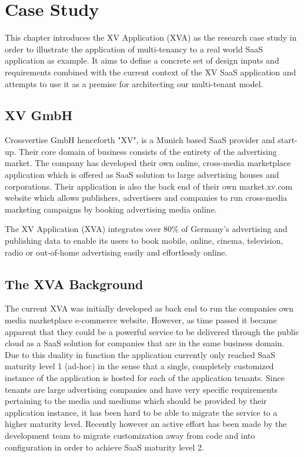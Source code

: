 \chapter{Case Study}

This chapter introduces the XV Application (XVA) as the research case study in order to illustrate the application of multi-tenancy  to a real world SaaS  application as example. It aims to define a concrete set of design inputs and requirements combined with the current context of the XV SaaS application and attempts to use it as a premise for architecting our multi-tenant model. 


\section{XV GmbH}

Crossvertise GmbH henceforth "XV", is a Munich based SaaS provider and start-up. Their core domain of business consists of the entirety of the advertising market. The company has developed their own online, cross-media marketplace application which is offered as SaaS solution to large advertising houses and corporations. Their application is also the back end of their own market.xv.com website which allows publishers, advertisers and companies to run cross-media marketing campaigns by booking advertising media online.
 
The XV Application (XVA) integrates over 80\% of Germany's advertising and publishing data to enable its users to book mobile, online, cinema, television, radio or out-of-home advertising easily and effortlessly online.



\section{The XVA Background}

The current XVA was initially developed as back end to run the companies own media marketplace e-commerce website. However, as time passed it became apparent that they could be a powerful service to be delivered through the public cloud as a SaaS solution for companies that are in the same business domain. Due to this duality in function the application currently only reached SaaS maturity  level 1 (ad-hoc) \cite{Chong2006} in the sense that a single, completely customized instance of the application is hosted for each of the application tenants. Since tenants are large advertising companies and have very specific requirements pertaining to the media and mediums which should be provided by their application instance, it has been hard to be able to migrate the service to a higher maturity level. Recently however an active effort has been made by the development team to migrate customization away from code and into configuration in order to achieve SaaS maturity level 2.
 
